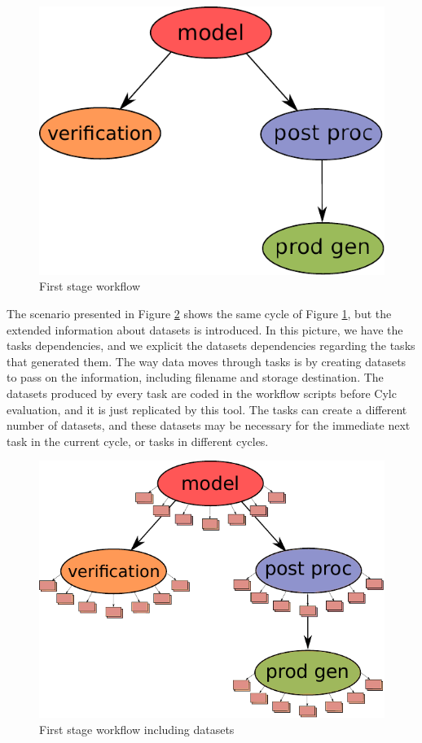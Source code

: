 \documentclass[a4paper]{article}
\begin{document}
{{{{\begin{figure}[H]
  \centering
  \includegraphics[width=0.4\columnwidth]{cycle1}
  \caption{First stage workflow}
  \label{fig:cycle1}
\end{figure}

The scenario presented in Figure \ref{fig:cycle-io} shows the same cycle of Figure \ref{fig:cycle1}, but the extended information about datasets is introduced.
In this picture, we have the tasks dependencies, and we explicit the datasets dependencies regarding the tasks that generated them.
The way data moves through tasks is by creating datasets to pass on the information, including filename and storage destination. The datasets produced by every task are coded in the workflow scripts before Cylc evaluation, and it is just replicated by this tool. The tasks can create a different number of datasets, and these datasets may be necessary for the immediate next task in the current cycle, or tasks in different cycles.

\begin{figure}[H]
  \centering
  \includegraphics[width=0.6\columnwidth]{cycle-io}
  \caption{First stage workflow including datasets}
  \label{fig:cycle-io}
\end{figure}

}}}}
\end{document}
